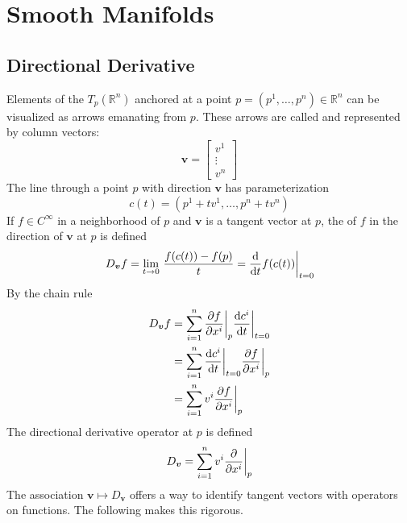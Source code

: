 


\newcommand{\gln}{\operatorname{GL}(n, \R)}
\newcommand{\Rnn}{\R^{n \times n}}
\section{Smooth Manifolds}\label{sec:dg}
\localtableofcontents

\subsection{Directional Derivative}

Elements of the  \(T_p (\mathbb{R}^n)\) anchored at a point \(p = (p^1, \dots, p^n) \in \mathbb{R}^n\) can be visualized as arrows emanating from \(p\).
%
These arrows are called  and represented by column vectors:
%
\begin{equation}
    \bm{v}
    =
    \begin{bmatrix}
        v^1 \\ \vdots \\ v^n
    \end{bmatrix}
\end{equation}
%
The line through a point \(p\) with direction \(\bm{v}\) has parameterization
%
\begin{equation}
    c(t) = \left( p^1 + t v^1, \dots, p^n + t v^n \right)
\end{equation}
%
If \(f \in C^\infty\) in a neighborhood of \(p\) and \(\bm{v}\) is a tangent vector at \(p\), the  of \(f\) in the direction of \(\bm{v}\) at \(p\) is defined
%
\begin{equation}
    D_{\bm{v}} f
    =
    \lim_{t\rightarrow 0}\, \frac{f(c(t)) - f(p)}{t}
    =
    \evalat[\bigg]{\dv{}{t} f(c(t))}{t=0}
\end{equation}
%
By the chain rule
%
\begin{align}
    D_{\bm{v}} f & = \sum_{i=1}^{n} \evalat[\bigg]{\pdv{f}{x^i}}{p} \evalat[\bigg]{\dv{c^i}{t}}{t=0} \\
                 & = \sum_{i=1}^{n} \evalat[\bigg]{\dv{c^i}{t}}{t=0} \evalat[\bigg]{\pdv{f}{x^i}}{p} \\
                 & = \sum_{i=1}^{n} v^i \evalat[\bigg]{\pdv{f}{x^i}}{p}\label{eqn:chainrule}         \\
\end{align}
%
The directional derivative operator at \(p\) is defined
%
\begin{equation}
    D_{\bm{v}} = \sum_{i=1}^{n} v^i \evalat[\bigg]{\pdv{}{x^i}}{p}
\end{equation}
%
The association \(\bm{v} \mapsto D_{\bm{v}}\) offers a way to  identify tangent vectors with operators on functions.
%
The following makes this rigorous.

